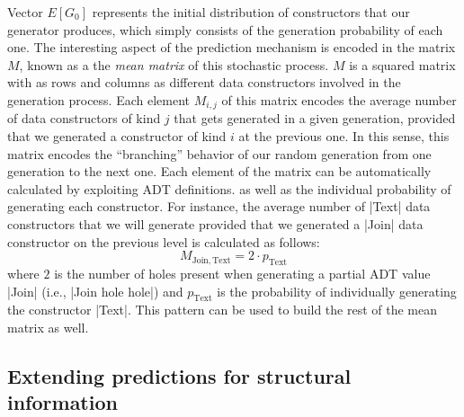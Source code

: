 Vector $E[G_0]$ represents the initial distribution of constructors that our
generator produces, which simply consists of the generation probability of each
one.
%
The interesting aspect of the prediction mechanism is encoded in the matrix $M$,
known as a the \emph{mean matrix} of this stochastic process.
%
$M$ is a squared matrix with as rows and columns as different data constructors
involved in the generation process.
%
Each element $M_{i,j}$ of this matrix encodes the average number of data
constructors of kind $j$ that gets generated in a given generation, provided that we
generated a constructor of kind $i$ at the previous one.
%
In this sense, this matrix encodes the ``branching'' behavior of our random
generation from one generation to the next one.
%
Each element of the matrix can be automatically calculated by exploiting ADT
definitions. %
%
%
as well as the individual probability of generating each constructor.
%
For instance, the average number of |Text| data constructors that we will
generate provided that we generated a |Join| data constructor on the previous
level is calculated as follows:
%
$$ M_{\mathrm{Join, Text}} = 2\cdot p_{\mathrm{Text}} $$
%
where $2$ is the number of holes present when generating a partial ADT value
|Join| (i.e., |Join hole hole|) and $p_{\mathrm{Text}}$ is the probability of
individually generating the constructor |Text|.
%
This pattern can be used to build the rest of the mean matrix as well.



\subsection{Extending predictions for structural information}

